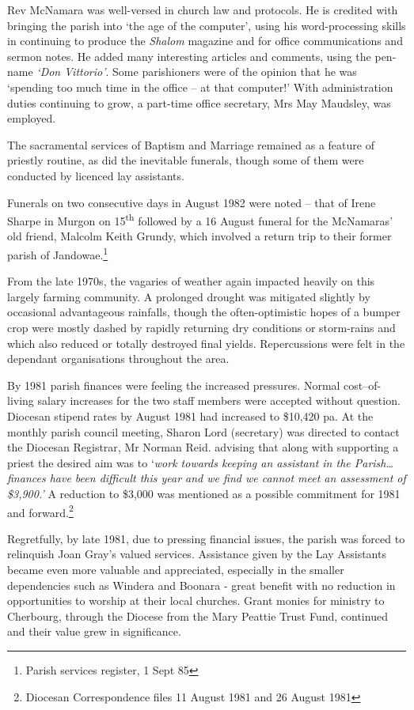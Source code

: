 Rev McNamara was well-versed in church law and protocols. He is credited
with bringing the parish into `the age of the computer', using his
word-processing skills in continuing to produce the \emph{Shalom}
magazine and for office communications and sermon notes. He added many
interesting articles and comments, using the pen-name \emph{`Don
Vittorio'}. Some parishioners were of the opinion that he was `spending
too much time in the office -- at that computer!' With administration
duties continuing to grow, a part-time office secretary, Mrs May
Maudsley, was employed.

The sacramental services of Baptism and Marriage remained as a feature
of priestly routine, as did the inevitable funerals, though some of them
were conducted by licenced lay assistants.

Funerals on two consecutive days in August 1982 were noted -- that of
Irene Sharpe in Murgon on 15\textsuperscript{th} followed by a 16 August
funeral for the McNamaras' old friend, Malcolm Keith Grundy, which
involved a return trip to their former parish of Jandowae.\footnote{Parish
  services register, 1 Sept 85}

From the late 1970s, the vagaries of weather again impacted heavily on
this largely farming community. A prolonged drought was mitigated
slightly by occasional advantageous rainfalls, though the
often-optimistic hopes of a bumper crop were mostly dashed by rapidly
returning dry conditions or storm-rains and which also reduced or
totally destroyed final yields. Repercussions were felt in the dependant
organisations throughout the area.

By 1981 parish finances were feeling the increased pressures. Normal
cost--of-living salary increases for the two staff members were accepted
without question. Diocesan stipend rates by August 1981 had increased to
\$10,420 pa. At the monthly parish council meeting, Sharon Lord
(secretary) was directed to contact the Diocesan Registrar, Mr Norman
Reid. advising that along with supporting a priest the desired aim was
to `\emph{work towards keeping an assistant in the Parish\ldots finances
have been difficult this year and we find we cannot meet an assessment
of \$3,900.'} A reduction to \$3,000 was mentioned as a possible
commitment for 1981 and forward.\footnote{Diocesan Correspondence files
  11 August 1981 and 26 August 1981}

Regretfully, by late 1981, due to pressing financial issues, the parish
was forced to relinquish Joan Gray's valued services. Assistance given
by the Lay Assistants became even more valuable and appreciated,
especially in the smaller dependencies such as Windera and Boonara -
great benefit with no reduction in opportunities to worship at their
local churches. Grant monies for ministry to Cherbourg, through the
Diocese from the Mary Peattie Trust Fund, continued and their value grew
in significance.

